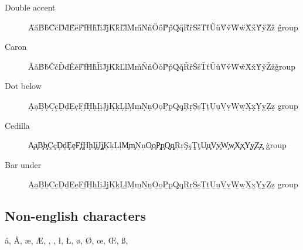 \documentclass[11pt]{article}
\begin{document}
\begin{description}
    \item[Double accent]  \H A\H a\H B\H b\H C\H c\H D\H d\H E\H e\H F\H f\H H\H h\H I\H i\H J\H j\H K\H k\H L\H l\H M\H m\H N\H n\H O\H o\H P\H p\H Q\H q\H R\H r\H S\H s\H T\H t\H U\H u\H V\H v\H W\H w\H X\H x\H Y\H y\H Z\H z \H{group}

    \item[Caron]\v A\v a\v B\v b\v C\v c\v D\v d\v E\v e\v F\v f\v H\v h\v I\v i\v J\v j\v K\v k\v L\v l\v M\v m\v N\v n\v O\v o\v P\v p\v Q\v q\v R\v r\v S\v s\v T\v t\v U\v u\v V\v v\v W\v w\v X\v x\v Y\v y\v Z\v z\v {group}

    \item[Dot below]  \d A\d a\d B\d b\d C\d c\d D\d d\d E\d e\d F\d f\d H\d h\d I\d i\d J\d j\d K\d k\d L\d l\d M\d m\d N\d n\d O\d o\d P\d p\d Q\d q\d R\d r\d S\d s\d T\d t\d U\d u\d V\d v\d W\d w\d X\d x\d Y\d y\d Z\d z \d{group}

    \item[Cedilla]  \c A\c a\c B\c b\c C\c c\c D\c d\c E\c e\c F\c f\c H\c h\c I\c i\c J\c j\c K\c k\c L\c l\c M\c m\c N\c n\c O\c o\c P\c p\c Q\c q\c R\c r\c S\c s\c T\c t\c U\c u\c V\c v\c W\c w\c X\c x\c Y\c y\c Z\c z \c{group}


    \item[Bar under]  \b A\b a\b B\b b\b C\b c\b D\b d\b E\b e\b F\b f\b H\b h\b I\b i\b J\b j\b K\b k\b L\b l\b M\b m\b N\b n\b O\b o\b P\b p\b Q\b q\b R\b r\b S\b s\b T\b t\b U\b u\b V\b v\b W\b w\b X\b x\b Y\b y\b Z\b z \b{group}

\end{description}

\subsection{Non-english characters}
\aa, \AA, \ae, \AE, \ij, \IJ, \l, \L, \o, \O, \oe, \OE, \ss, \SS
\end{document}
